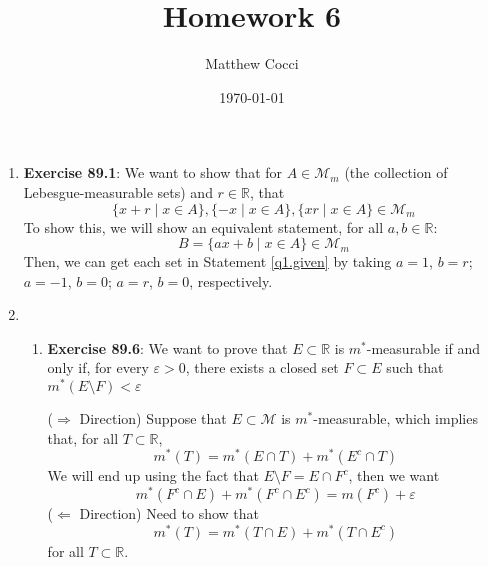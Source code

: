 \documentclass[12pt]{article}
\author{Matthew Cocci}
\title{\textbf{Homework 6}}
\date{\today}
\theoremstyle{plain}
\theoremstyle{definition}
\theoremstyle{remark}
\begin{document}
\maketitle 

\begin{enumerate} 

\item \textbf{Exercise 89.1}: We want to show that for $A\in\mathscr{M}_m$ (the collection of Lebesgue-measurable sets) and $r\in\mathbb{R}$, that 
\begin{equation}
    \label{q1.given}
    \{x+r\;|\;x\in A\}, 
    \{-x\;|\;x\in A\}, 
    \{xr\;|\;x\in A\}\in \mathscr{M}_m
\end{equation}
To show this, we will show an equivalent statement, for all $a,b\in\mathbb{R}$:
\begin{equation}
    \label{q1.equiv}
    B = \{ax+b\;|\;x\in A\}\in\mathscr{M}_m
\end{equation}
Then, we can get each set in Statement \ref{q1.given} by taking $a=1$, $b=r$; $a=-1$, $b=0$; $a=r$, $b=0$, respectively.


\item 
    
\begin{enumerate}

\item \textbf{Exercise 89.6}: We want to prove that $E\subset \mathbb{R}$ is $m^*$-measurable if and only if, for every $\varepsilon>0$, there exists a closed set $F\subset E$ such that $m^*(E\setminus F)< \varepsilon$

($\Rightarrow$ Direction) Suppose that $E\subset \mathscr{M}$ is $m^*$-measurable, which implies that, for all $T\subset\mathbb{R}$,
\begin{equation}
    m^*(T) = m^*(E\cap T) + m^*(E^c \cap T)
\end{equation}
We will end up using the fact that $E\setminus F = E\cap F^c$, then we want
\[
    m^*(F^c \cap E) + 
    m^*(F^c \cap E^c) = m(F^c) + \varepsilon
\]
($\Leftarrow$ Direction) Need to show that 
\[
    m^*(T) = m^*(T\cap E) + m^*(T\cap E^c)
\]
for all $T\subset\mathbb{R}$.


\end{enumerate}

\end{enumerate}
\end{document}
